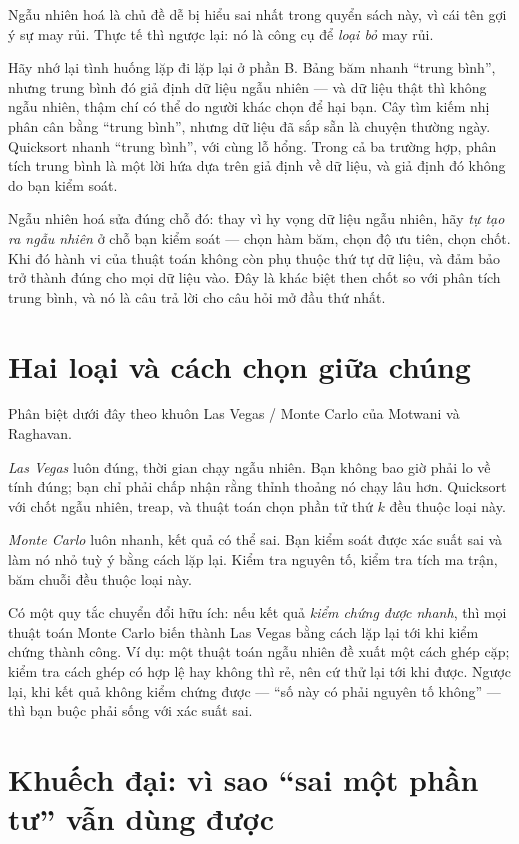 \documentclass[../../algorithm.tex]{subfiles}
\begin{document}
Ngẫu nhiên hoá là chủ đề dễ bị hiểu sai nhất trong quyển sách này, vì cái tên gợi ý sự may rủi. Thực tế thì ngược lại: nó là công cụ để \emph{loại bỏ} may rủi.

Hãy nhớ lại tình huống lặp đi lặp lại ở phần B. Bảng băm nhanh ``trung bình'', nhưng trung bình đó giả định dữ liệu ngẫu nhiên --- và dữ liệu thật thì không ngẫu nhiên, thậm chí có thể do người khác chọn để hại bạn. Cây tìm kiếm nhị phân cân bằng ``trung bình'', nhưng dữ liệu đã sắp sẵn là chuyện thường ngày. Quicksort nhanh ``trung bình'', với cùng lỗ hổng. Trong cả ba trường hợp, phân tích trung bình là một lời hứa dựa trên giả định về dữ liệu, và giả định đó không do bạn kiểm soát.

Ngẫu nhiên hoá sửa đúng chỗ đó: thay vì hy vọng dữ liệu ngẫu nhiên, hãy \emph{tự tạo ra ngẫu nhiên} ở chỗ bạn kiểm soát --- chọn hàm băm, chọn độ ưu tiên, chọn chốt. Khi đó hành vi của thuật toán không còn phụ thuộc thứ tự dữ liệu, và đảm bảo trở thành đúng cho mọi dữ liệu vào. Đây là khác biệt then chốt so với phân tích trung bình, và nó là câu trả lời cho câu hỏi mở đầu thứ nhất.

\section{Hai loại và cách chọn giữa chúng}

Phân biệt dưới đây theo khuôn Las Vegas / Monte Carlo của Motwani và Raghavan\cite{motwani1995}.

\emph{Las Vegas} luôn đúng, thời gian chạy ngẫu nhiên. Bạn không bao giờ phải lo về tính đúng; bạn chỉ phải chấp nhận rằng thỉnh thoảng nó chạy lâu hơn. Quicksort với chốt ngẫu nhiên, treap, và thuật toán chọn phần tử thứ \(k\) đều thuộc loại này.

\emph{Monte Carlo} luôn nhanh, kết quả có thể sai. Bạn kiểm soát được xác suất sai và làm nó nhỏ tuỳ ý bằng cách lặp lại. Kiểm tra nguyên tố, kiểm tra tích ma trận, băm chuỗi đều thuộc loại này.

Có một quy tắc chuyển đổi hữu ích: nếu kết quả \emph{kiểm chứng được nhanh}, thì mọi thuật toán Monte Carlo biến thành Las Vegas bằng cách lặp lại tới khi kiểm chứng thành công. Ví dụ: một thuật toán ngẫu nhiên đề xuất một cách ghép cặp; kiểm tra cách ghép có hợp lệ hay không thì rẻ, nên cứ thử lại tới khi được. Ngược lại, khi kết quả không kiểm chứng được --- ``số này có phải nguyên tố không'' --- thì bạn buộc phải sống với xác suất sai.

\section{Khuếch đại: vì sao ``sai một phần tư'' vẫn dùng được}
\end{document}
